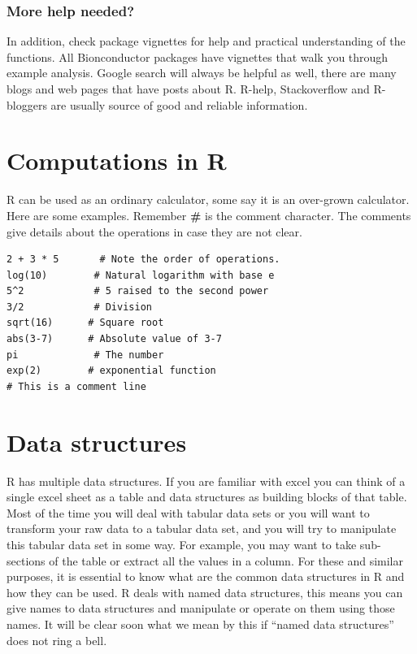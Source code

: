 \documentclass[12pt,]{krantz}
\begin{document}
\hypertarget{more-help-needed}{%
\subsubsection{More help needed?}\label{more-help-needed}}

In addition, check package vignettes for help and practical understanding of the functions. All Bionconductor packages have vignettes that walk you through example analysis. Google search will always be helpful as well, there are many blogs and web pages that have posts about R. R-help, Stackoverflow and R-bloggers are usually source of good and reliable information.

\hypertarget{computations-in-r}{%
\section{Computations in R}\label{computations-in-r}}

R can be used as an ordinary calculator, some say it is an over-grown calculator. Here are some examples. Remember \textbf{\#} is the comment character. The comments give details about the operations in case they are not clear.

\begin{verbatim}
2 + 3 * 5       # Note the order of operations.
log(10)        # Natural logarithm with base e
5^2            # 5 raised to the second power
3/2            # Division
sqrt(16)      # Square root
abs(3-7)      # Absolute value of 3-7
pi             # The number
exp(2)        # exponential function
# This is a comment line

\end{verbatim}

\hypertarget{data-structures}{%
\section{Data structures}\label{data-structures}}

R has multiple data structures. If you are familiar with excel you can think of a single excel sheet as a table and data structures as building blocks of that table. Most of the time you will deal with tabular data sets or you will want to transform your raw data to a tabular data set, and you will try to manipulate this tabular data set in some way. For example, you may want to take sub-sections of the table or extract all the values in a column. For these and similar purposes, it is essential to know what are the common data structures in R and how they can be used. R deals with named data structures, this means you can give names to data structures and manipulate or operate on them using those names. It will be clear soon what we mean by this if ``named data structures'' does not ring a bell.
\end{document}
